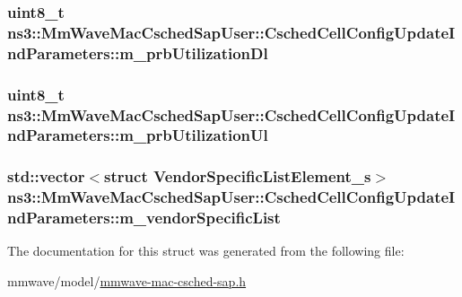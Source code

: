 \subsubsection[{\texorpdfstring{m\+\_\+prb\+Utilization\+Dl}{m_prbUtilizationDl}}]{\setlength{\rightskip}{0pt plus 5cm}uint8\+\_\+t ns3\+::\+Mm\+Wave\+Mac\+Csched\+Sap\+User\+::\+Csched\+Cell\+Config\+Update\+Ind\+Parameters\+::m\+\_\+prb\+Utilization\+Dl}\hypertarget{structns3_1_1MmWaveMacCschedSapUser_1_1CschedCellConfigUpdateIndParameters_a011392b6189a89891a0d260b774e8692}{}\label{structns3_1_1MmWaveMacCschedSapUser_1_1CschedCellConfigUpdateIndParameters_a011392b6189a89891a0d260b774e8692}
\subsubsection[{\texorpdfstring{m\+\_\+prb\+Utilization\+Ul}{m_prbUtilizationUl}}]{\setlength{\rightskip}{0pt plus 5cm}uint8\+\_\+t ns3\+::\+Mm\+Wave\+Mac\+Csched\+Sap\+User\+::\+Csched\+Cell\+Config\+Update\+Ind\+Parameters\+::m\+\_\+prb\+Utilization\+Ul}\hypertarget{structns3_1_1MmWaveMacCschedSapUser_1_1CschedCellConfigUpdateIndParameters_a52b1bd49b16bb3eb578cd8a25f60b904}{}\label{structns3_1_1MmWaveMacCschedSapUser_1_1CschedCellConfigUpdateIndParameters_a52b1bd49b16bb3eb578cd8a25f60b904}
\subsubsection[{\texorpdfstring{m\+\_\+vendor\+Specific\+List}{m_vendorSpecificList}}]{\setlength{\rightskip}{0pt plus 5cm}std\+::vector$<$struct {\bf Vendor\+Specific\+List\+Element\+\_\+s}$>$ ns3\+::\+Mm\+Wave\+Mac\+Csched\+Sap\+User\+::\+Csched\+Cell\+Config\+Update\+Ind\+Parameters\+::m\+\_\+vendor\+Specific\+List}\hypertarget{structns3_1_1MmWaveMacCschedSapUser_1_1CschedCellConfigUpdateIndParameters_ab7440af75efc51ce841b6cf666baa078}{}\label{structns3_1_1MmWaveMacCschedSapUser_1_1CschedCellConfigUpdateIndParameters_ab7440af75efc51ce841b6cf666baa078}


The documentation for this struct was generated from the following file\+:\begin{DoxyCompactItemize}
\item 
mmwave/model/\hyperlink{mmwave-mac-csched-sap_8h}{mmwave-\/mac-\/csched-\/sap.\+h}\end{DoxyCompactItemize}
